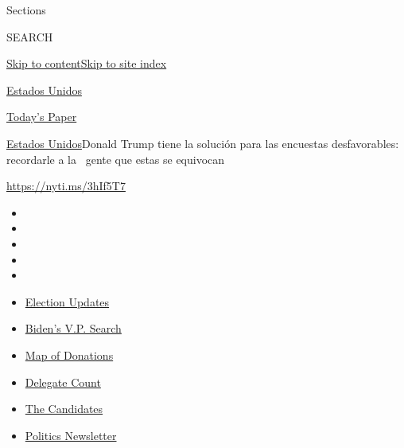 Sections

SEARCH

\protect\hyperlink{site-content}{Skip to
content}\protect\hyperlink{site-index}{Skip to site index}

\href{https://www.nytimes.com/es/section/estados-unidos}{Estados Unidos}

\href{https://myaccount.nytimes.com/auth/login?response_type=cookie\&client_id=vi}{}

\href{https://www.nytimes.com/section/todayspaper}{Today's Paper}

\href{/es/section/estados-unidos}{Estados Unidos}\textbar{}Donald Trump
tiene la solución para las encuestas desfavorables: recordarle a la~
gente que estas se equivocan

\url{https://nyti.ms/3hIf5T7}

\begin{itemize}
\item
\item
\item
\item
\item
\end{itemize}

\begin{itemize}
\item
  \href{https://www.nytimes.com/2020/07/31/us/elections/biden-vs-trump.html?action=click\&pgtype=Article\&state=default\&region=TOP_BANNER\&context=storylines_menu}{Election
  Updates}
\item
  \href{https://www.nytimes.com/article/biden-vice-president-2020.html?action=click\&pgtype=Article\&state=default\&region=TOP_BANNER\&context=storylines_menu}{Biden's
  V.P. Search}
\item
  \href{https://www.nytimes.com/interactive/2020/07/24/us/politics/trump-biden-campaign-donors.html?action=click\&pgtype=Article\&state=default\&region=TOP_BANNER\&context=storylines_menu}{Map
  of Donations}
\item
  \href{https://www.nytimes.com/interactive/2020/us/elections/delegate-count-primary-results.html?action=click\&pgtype=Article\&state=default\&region=TOP_BANNER\&context=storylines_menu}{Delegate
  Count}
\item
  \href{https://www.nytimes.com/interactive/2019/us/politics/2020-presidential-candidates.html?action=click\&pgtype=Article\&state=default\&region=TOP_BANNER\&context=storylines_menu}{The
  Candidates}
\item
  \href{https://www.nytimes.com/newsletters/politics?action=click\&pgtype=Article\&state=default\&region=TOP_BANNER\&context=storylines_menu}{Politics
  Newsletter}
\end{itemize}

